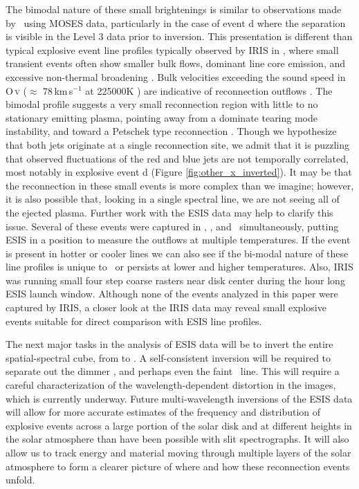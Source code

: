 	The bimodal nature of these small brightenings is similar to observations made by \citet{Rust2019} \heii \ using MOSES data, particularly in the case of event d where the separation is visible in the Level 3 data prior to inversion.
	This presentation is different than typical explosive event line profiles typically observed by IRIS in \siiv, where small transient events often show smaller bulk flows, dominant line core emission, and excessive non-thermal broadening \citep{Innes2015,Chitta2017}. 
	Bulk velocities exceeding the sound speed in O\,\textsc{v} ($\approx$ 78\,km\,s$^{-1}$ at 225000K )  are indicative of reconnection outflows \citep{innes1997,more}.  
	The bimodal profile suggests a very small reconnection region with little to no stationary emitting plasma, pointing away from a dominate tearing mode instability, and toward a Petschek type reconnection \citep{Innes2015,more}.
	Though we hypothesize that both jets originate at a single reconnection site, we admit that it is puzzling that observed fluctuations of the red and blue jets are not temporally correlated, most notably in explosive event d (Figure \ref{fig:other_x_inverted}).
	It may be that the reconnection in these small events is more complex than we imagine; however, it is also possible that, looking in a single spectral line, we are not seeing all of the ejected plasma. 
	Further work with the ESIS data may help to clarify this issue.
	Several of these events were captured in \hei, \mgxbright, and \ov \ simultaneously, putting ESIS in a position to measure the outflows at multiple temperatures. 
	If the event is present in hotter or cooler lines we can also see if the bi-modal nature of these line profiles is unique to \ov \ or persists at lower and higher temperatures.
	Also, IRIS was running small four step coarse rasters near disk center during the hour long ESIS launch window.
	Although none of the events analyzed in this paper were captured by IRIS, a closer look at the IRIS data may reveal small explosive events suitable for direct comparison with ESIS line profiles.	
	
	The next major tasks in the analysis of ESIS data will be to invert the entire spatial-spectral cube, from  to . 
	A self-consistent inversion will be required to separate out the dimmer \mgxdim, and perhaps even the faint \oiii \ line. This will require a careful characterization of the wavelength-dependent distortion in the images, which is currently underway.
	Future multi-wavelength inversions of the ESIS data will allow for more accurate estimates of the frequency and distribution of explosive events across a large portion of the solar disk and at different heights in the solar atmosphere than have been possible with slit spectrographs.
	It will also allow us to track energy and material moving through multiple layers of the solar atmosphere to form a clearer picture of where and how these reconnection events unfold. 
	
